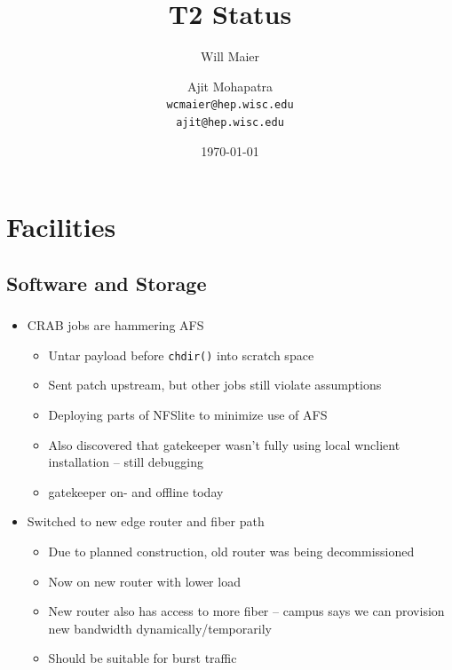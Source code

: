 \documentclass{beamer}
\title{T2 Status}
\author[Maier, Mohapatra]{
    Will Maier \and Ajit Mohapatra\\ 
    {\tt wcmaier@hep.wisc.edu}\\
    {\tt ajit@hep.wisc.edu}}
\institute[Wisconsin]{University of Wisconsin - High Energy Physics}
\date{\today}
\begin{document}
\begin{frame}
    \titlepage
\end{frame}


\section{Facilities}
\subsection{Software and Storage}
\begin{frame}
\frametitle{}
\begin{itemize}
    \item CRAB jobs are hammering AFS
    \begin{itemize}
        \item Untar payload before {\tt chdir()} into scratch space
        \item Sent patch upstream, but other jobs still violate assumptions
        \item Deploying parts of NFSlite to minimize use of AFS
        \item Also discovered that gatekeeper wasn't fully using local wnclient installation -- still debugging
        \item gatekeeper on- and offline today
    \end{itemize}
    \item Switched to new edge router and fiber path
    \begin{itemize}
        \item Due to planned construction, old router was being decommissioned
        \item Now on new router with lower load
        \item New router also has access to more fiber -- campus says we can provision new bandwidth dynamically/temporarily
        \item Should be suitable for burst traffic
    \end{itemize}
\end{itemize}
\end{frame}
\end{document}

